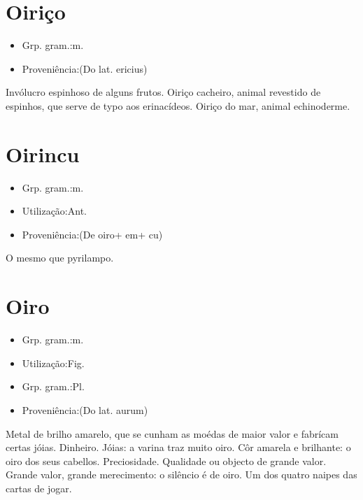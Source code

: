 \section{Oiriço}
\begin{itemize}
\item {Grp. gram.:m.}
\end{itemize}
\begin{itemize}
\item {Proveniência:(Do lat. \textunderscore ericius\textunderscore )}
\end{itemize}
Invólucro espinhoso de alguns frutos.
\textunderscore Oiriço cacheiro\textunderscore , animal revestido de espinhos, que serve de typo aos erinacídeos.
\textunderscore Oiriço do mar\textunderscore , animal echinoderme.
\section{Oirincu}
\begin{itemize}
\item {Grp. gram.:m.}
\end{itemize}
\begin{itemize}
\item {Utilização:Ant.}
\end{itemize}
\begin{itemize}
\item {Proveniência:(De \textunderscore oiro\textunderscore  + \textunderscore em\textunderscore  + \textunderscore cu\textunderscore )}
\end{itemize}
O mesmo que \textunderscore pyrilampo\textunderscore .
\section{Oiro}
\begin{itemize}
\item {Grp. gram.:m.}
\end{itemize}
\begin{itemize}
\item {Utilização:Fig.}
\end{itemize}
\begin{itemize}
\item {Grp. gram.:Pl.}
\end{itemize}
\begin{itemize}
\item {Proveniência:(Do lat. \textunderscore aurum\textunderscore )}
\end{itemize}
Metal de brilho amarelo, que se cunham as moédas de maior valor e fabrícam certas jóias.
Dinheiro.
Jóias: \textunderscore a varina traz muito oiro\textunderscore .
Côr amarela e brilhante: \textunderscore o oiro dos seus cabellos\textunderscore .
Preciosidade.
Qualidade ou objecto de grande valor.
Grande valor, grande merecimento: \textunderscore o silêncio é de oiro\textunderscore .
Um dos quatro naipes das cartas de jogar.
